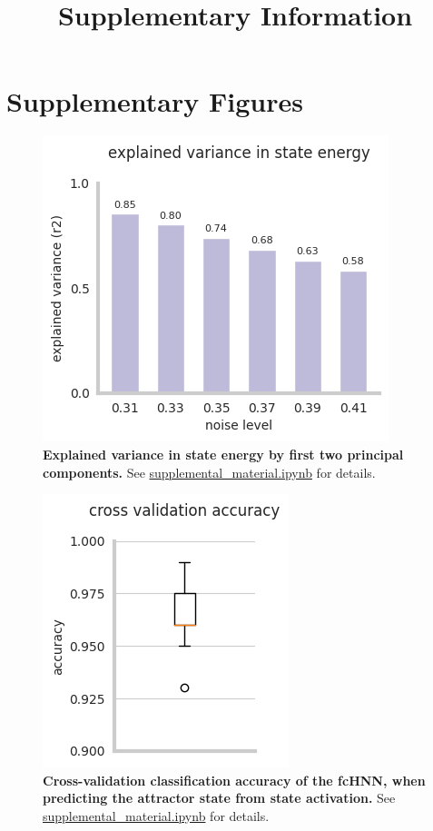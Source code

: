 \documentclass{article}
\title{Supplementary Information}
\date{\displaydate{articleDate}}
\author{}
\begin{document}
\maketitle


\keywords{}

\section{Supplementary Figures}

\begin{figure}[!htbp]
\centering
\includegraphics[width=0.7\linewidth]{files/expl_variance_energy-aacc95d67de678aa172773ecc8291898.png}
\caption[]{\textbf{Explained variance in state energy by first two principal components.} See \href{https://github.com/pni-lab/connattractor/blob/master/notebooks/supplemental\_material.ipynb}{supplemental\_material.ipynb} for details.}
\label{si_expl_variance_energy}
\end{figure}

\begin{figure}[!htbp]
\centering
\includegraphics[width=0.7\linewidth]{files/classification_acc_s-ed13c90eeb3cdb75fdb961ede49009ae.png}
\caption[]{\textbf{Cross-validation classification accuracy of the fcHNN, when predicting the attractor state from state
activation.}  See \href{https://github.com/pni-lab/connattractor/blob/master/notebooks/supplemental\_material.ipynb}{supplemental\_material.ipynb} for details.}
\label{si_classification_acc_state_basins}
\end{figure}
\end{document}
